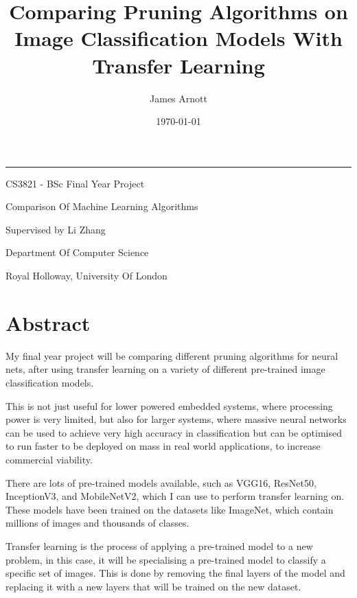 \documentclass{article}
\title{\titleFont Comparing Pruning Algorithms on Image Classification Models With Transfer Learning}
\date{\Large \today}
\author{\subtitleFont James Arnott}
\begin{document}
\maketitle

\begin {center}
\noindent\rule{15cm}{0.4pt}
\end{center}

\vspace{1cm}

\begin{center}
	\begin{Large}
			CS3821 - BSc Final Year Project
			
			Comparison Of Machine Learning Algorithms

			Supervised by Li Zhang

			\vspace{0.6cm}

			Department Of Computer Science

			\vspace{0.2cm}

			Royal Holloway, University Of London
	\end{Large}
\end{center}


\pagebreak

\section{Abstract}
My final year project will be comparing different pruning algorithms for neural nets,
after using transfer learning on a variety of different pre-trained image classification models.

This is not just useful for lower powered embedded systems\cite{EmbeddedSystems},
where processing power is very limited, but also for larger systems,
where massive neural networks can be used to achieve very
high accuracy in classification but can be optimised to run faster
to be deployed on mass in real world applications, to increase
commercial viability.

There are lots of pre-trained models available, such as VGG16, ResNet50, InceptionV3,
and MobileNetV2, which I can use to perform transfer learning on. These models
have been trained on the datasets like ImageNet, which contain millions of images
and thousands of classes.

Transfer learning is the process of applying a pre-trained model to a new problem,
in this case, it will be specialising a pre-trained model to classify a specific set of images.
This is done by removing the final layers of the model and replacing it with a new layers
that will be trained on the new dataset.
\end{document}
